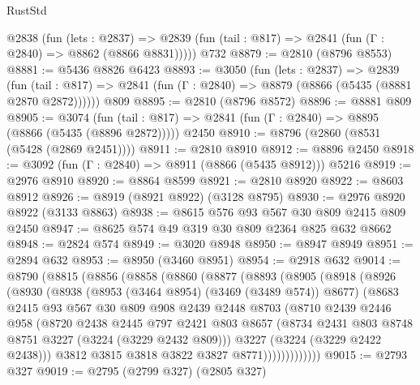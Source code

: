 \begin{lexlean}{RustStd}
\begin{coremodule}
    @2838
      (fun (lets : @2837) =>
      @2839 (fun (tail : @817) => @2841 (fun (Γ : @2840) => @8862 (@8866 @8831)))))
    @732
@8879 := @2810 (@8796 @8553)
@8881 := @5436 @8826 @6423
@8893 := @3050
    (fun (lets : @2837) =>
    @2839
      (fun (tail : @817) => @2841 (fun (Γ : @2840) => @8879 (@8866 (@5435 (@8881 @2870 @2872))))))
    @809
@8895 := @2810 (@8796 @8572)
@8896 := @8881 @809
@8905 := @3074
    (fun (tail : @817) => @2841 (fun (Γ : @2840) => @8895 (@8866 (@5435 (@8896 @2872)))))
    @2450
@8910 := @8796 (@2860 (@8531 (@5428 (@2869 @2451))))
@8911 := @2810 @8910
@8912 := @8896 @2450
@8918 := @3092 (fun (Γ : @2840) => @8911 (@8866 (@5435 @8912))) @5216
@8919 := @2976 @8910
@8920 := @8864 @8599
@8921 := @2810 @8920
@8922 := @8603 @8912
@8926 := @8919 (@8921 @8922) (@3128 @8795)
@8930 := @2976 @8920 @8922 (@3133 @8863)
@8938 := @8615 @576 @93 @567 @30 @809 @2415 @809 @2450
@8947 := @8625 @574 @49 @319 @30 @809 @2364 @825 @632 @8662
@8948 := @2824 @574
@8949 := @3020 @8948
@8950 := @8947 @8949
@8951 := @2894 @632
@8953 := @8950 (@3460 @8951)
@8954 := @2918 @632
@9014 := @8790
    (@8815
      (@8856
        (@8858
          (@8860
            (@8877
              (@8893
                (@8905
                  (@8918
                    (@8926
                      (@8930
                        (@8938
                          (@8953 (@3464 @8954) (@3469 (@3489 @574)) @8677)
                          (@8683
                            @2415
                            @93
                            @567
                            @30
                            @809
                            @908
                            @2439
                            @2448
                            @8703
                            (@8710
                              @2439
                              @2446
                              @958
                              (@8720
                                @2438
                                @2445
                                @797
                                @2421
                                @803
                                @8657
                                (@8734 @2431 @803 @8748 @8751 @3227 (@3224 (@3229 @2432 @809)))
                                @3227
                                (@3224 (@3229 @2422 @2438)))
                              @3812
                              @3815
                              @3818
                              @3822
                              @3827
                              @8771)))))))))))))
@9015 := @2793 @327
@9019 := @2795 (@2799 @327) (@2805 @327)

\end{coremodule}
\end{lexlean}
